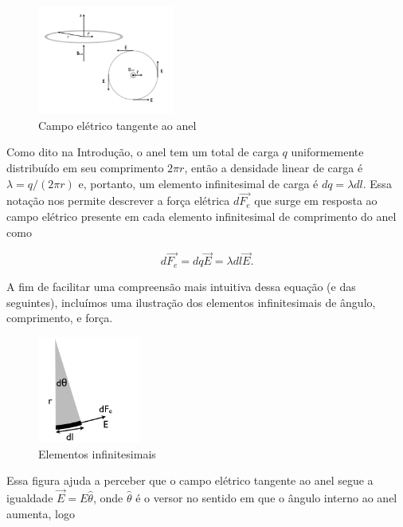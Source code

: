 \documentclass[
	article,
	11pt,
	oneside,
	a4paper,
	english,
	brazil,
	sumario=tradicional
	]{abntex2}
\begin{document}
\begin{figure}[htb]
    \caption{Campo elétrico tangente ao anel}\label{campo-tangencial-img}
    \centering
    \includegraphics[width=0.4\textwidth]{corrente_tangencial.png}
\end{figure}

Como dito na Introdução, o anel tem um total de carga $q$ uniformemente distribuído em seu comprimento $2\pi r$, então a densidade linear de carga é $\lambda = q/(2\pi r)$ e, portanto, um elemento infinitesimal de carga é $dq = \lambda dl$. Essa notação nos permite descrever a força elétrica $d \vec{F_e}$ que surge em resposta ao campo elétrico presente em cada elemento infinitesimal de comprimento do anel como

\begin{equation} \label{lei-de-faraday-eq}
    d \vec{F_e} = dq \vec{E} = \lambda dl \vec{E}.
\end{equation}

A fim de facilitar uma compreensão mais intuitiva dessa equação (e das seguintes), incluímos uma ilustração dos elementos infinitesimais de ângulo, comprimento, e força.

\begin{figure}[htb]\label{elementos-infinitesimais-img}
    \caption{Elementos infinitesimais}
    \centering
    \includegraphics[width=0.3\textwidth]{elementos_infinitesimais.png}
\end{figure}

Essa figura ajuda a perceber que o campo elétrico tangente ao anel segue a igualdade $\vec{E} = E \hat{\theta}$, onde $\hat{\theta}$ é o versor no sentido em que o ângulo interno ao anel aumenta, logo
\end{document}
